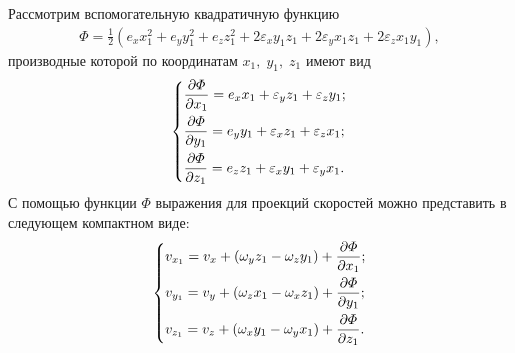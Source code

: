 	Рассмотрим вспомогательную квадратичную функцию
	\begin{gather}
		\varPhi = \frac{1}{2}\left(e_x x_1^2 + e_y y_1^2 + e_z z_1^2 + 2\varepsilon_x y_1 z_1 + 2\varepsilon_y x_1 z_1 + 2\varepsilon_z x_1 y_1\right),
	\end{gather}
	производные которой по координатам $x_1,\; y_1,\; z_1$ имеют вид
	\begin{gather}
		\begin{dcases}
			\frac{\partial \varPhi}{\partial x_1} = e_x x_1 + \varepsilon_y z_1 + \varepsilon_z y_1;\\
			\frac{\partial \varPhi}{\partial y_1} = e_y y_1 + \varepsilon_x z_1 + \varepsilon_z x_1;\\
			\frac{\partial \varPhi}{\partial z_1} = e_z z_1 + \varepsilon_x y_1 + \varepsilon_y x_1.
		\end{dcases}
	\end{gather}\n
	С помощью функции $\varPhi$ выражения для проекций скоростей можно представить в следующем компактном виде:
	\begin{gather}
		\begin{dcases}\label{eq:220}
			v_{x_1} = v_x + \left(\omega_y z_1 - \omega_z y_1\right) + \frac{\partial \varPhi}{\partial x_1};\\
			v_{y_1} = v_y + \left(\omega_z x_1 - \omega_x z_1\right) + \frac{\partial \varPhi}{\partial y_1};\\
			v_{z_1} = v_z + \left(\omega_x y_1 - \omega_y x_1\right) + \frac{\partial \varPhi}{\partial z_1}.
		\end{dcases}
	\end{gather}
	

